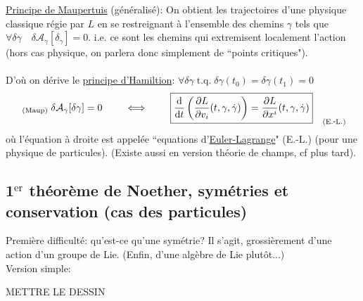 \documentclass[a4paper,11pt]{article}
\renewcommand{\d}{{\mathrm{d}}}
\newcommand{\dr}[2]{\frac{\partial {#1}}{\partial{#2}}}
\begin{document}
\underline{Principe de Maupertuis} (généralisé): On obtient les trajectoires d'une physique classique régie par $L$ en se restreignant à l'ensemble des chemins $\gamma$ tels que $\forall \delta \gamma \quad \delta\mathcal{A}_\gamma[\delta_\gamma]=0$. i.e. ce sont les chemins qui extremisent localement l'action (hors cas physique, on parlera donc simplement de ``points critiques").\\ \\
D'où on dérive le \underline{principe d'Hamiltion}: 
$\forall \delta\gamma \; \mathrm{t}.\mathrm{q}.\; \delta\gamma(t_0)=\delta\gamma(t_1)=0$
\begin{equation*}
\;_{(\mathrm{Maup})} \; \delta\mathcal{A}_\gamma[\delta\gamma] = 0 \quad \quad \iff \quad \quad \boxed{\frac{\d}{\d t}\left(\dr{L}{v_i}(t,\gamma,\dot\gamma)\right) = \dr{L}{x^i}(t,\gamma,\dot\gamma)}_{\quad(\mathrm{E}.\scalebox{0.75}[1.0]{-}\mathrm{L}.)}
\end{equation*}
où l'équation à droite est appelée ``equations d'\underline{Euler-Lagrange}" (E.-L.) (pour une physique de particules). (Existe aussi en version théorie de champs, cf plus tard).

\subsection{1$^\mathrm{er}$ théorème de Noether, symétries et conservation (cas des particules)}
Première difficulté: qu'est-ce qu'une symétrie? Il s'agit, grossièrement d'une action d'un groupe de Lie. (Enfin, d'une algèbre de Lie plutôt...)\\
Version simple:

METTRE LE DESSIN
\end{document}
